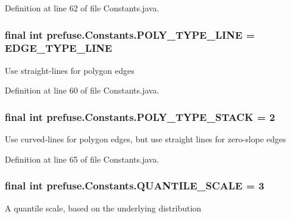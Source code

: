 \-Definition at line 62 of file \-Constants.\-java.

\hypertarget{interfaceprefuse_1_1_constants_a3f9e025aca38973989eea323264cd5e1}{
\subsubsection[{\-P\-O\-L\-Y\-\_\-\-T\-Y\-P\-E\-\_\-\-L\-I\-N\-E}]{\setlength{\rightskip}{0pt plus 5cm}final int {\bf prefuse.\-Constants.\-P\-O\-L\-Y\-\_\-\-T\-Y\-P\-E\-\_\-\-L\-I\-N\-E} = {\bf \-E\-D\-G\-E\-\_\-\-T\-Y\-P\-E\-\_\-\-L\-I\-N\-E}}}\label{interfaceprefuse_1_1_constants_a3f9e025aca38973989eea323264cd5e1}
\-Use straight-\/lines for polygon edges 

\-Definition at line 60 of file \-Constants.\-java.

\hypertarget{interfaceprefuse_1_1_constants_a70ce90ce56cf918c622f73f000e2e04a}{
\subsubsection[{\-P\-O\-L\-Y\-\_\-\-T\-Y\-P\-E\-\_\-\-S\-T\-A\-C\-K}]{\setlength{\rightskip}{0pt plus 5cm}final int {\bf prefuse.\-Constants.\-P\-O\-L\-Y\-\_\-\-T\-Y\-P\-E\-\_\-\-S\-T\-A\-C\-K} = 2}}\label{interfaceprefuse_1_1_constants_a70ce90ce56cf918c622f73f000e2e04a}
\-Use curved-\/lines for polygon edges, but use straight lines for zero-\/slope edges 

\-Definition at line 65 of file \-Constants.\-java.

\hypertarget{interfaceprefuse_1_1_constants_a1a7430af31ee161809704331ec8a6e9d}{
\subsubsection[{\-Q\-U\-A\-N\-T\-I\-L\-E\-\_\-\-S\-C\-A\-L\-E}]{\setlength{\rightskip}{0pt plus 5cm}final int {\bf prefuse.\-Constants.\-Q\-U\-A\-N\-T\-I\-L\-E\-\_\-\-S\-C\-A\-L\-E} = 3}}\label{interfaceprefuse_1_1_constants_a1a7430af31ee161809704331ec8a6e9d}
\-A quantile scale, based on the underlying distribution 

